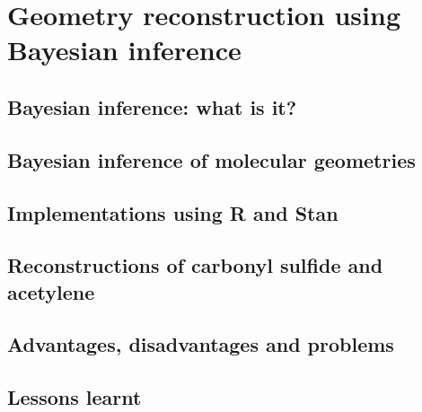 \chapter{Geometry reconstruction using Bayesian inference}\label{ch:bayesian}

\section{Bayesian inference: what is it?}

\section{Bayesian inference of molecular geometries}

\section{Implementations using R and Stan}

\section{Reconstructions of carbonyl sulfide and acetylene}

\section{Advantages, disadvantages and problems}

\section{Lessons learnt}